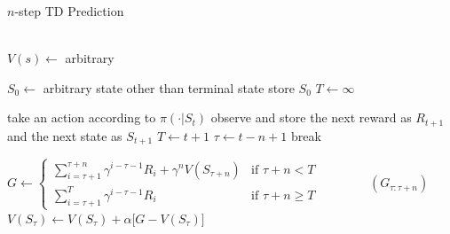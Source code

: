 \documentclass[../../main.tex]{subfiles}
\begin{document}
        {$n$-step TD Prediction}
        { \\
        \inputitem{$\alpha \in (0, 1]$}{step size parameter} \\
        }
        {}
        {
            {
                $V(s) \leftarrow$ arbitrary\;
            }

            {
                $S_0 \leftarrow$ arbitrary state other than terminal state\;
                store $S_0$\;
                $T \leftarrow \infty$\;
                {
                    {
                        take an action according to $\pi(\cdot|S_t)$\;
                        observe and store the next reward as $R_{t+1}$ and the next state as $S_{t+1}$\;
                        {
                            $T \leftarrow t+1$\;
                        }
                    }
                    $\tau \leftarrow t-n+1$\;
                    {        
                        break\;
                    }
                    {
                        $G \leftarrow
                        \begin{cases}
                            \sum_{i=\tau + 1}^{\tau + n} \gamma^{i-\tau-1}R_i + \gamma^n V(S_{\tau + n}) &\text{if $\tau + n < T$}\\
                            \sum_{i=\tau + 1}^T \gamma^{i-\tau-1}R_i &\text{if $\tau + n \geq T$}
                        \end{cases}\qquad\qquad(G_{\tau:\tau+n})$\;
                        $V(S_\tau) \leftarrow V(S_\tau) + \alpha \big[ G - V(S_\tau) \big]$\;
                        
                    }
                    
                }
            }
        }
\end{document}
